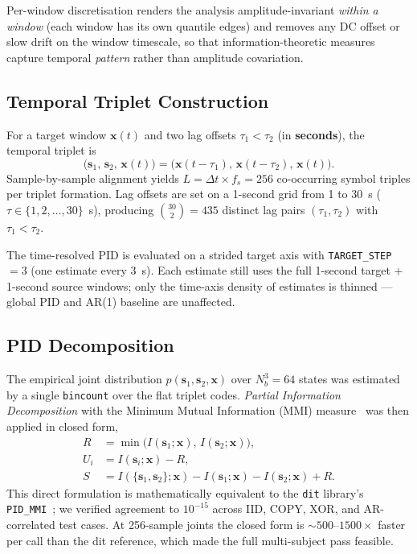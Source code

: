 \documentclass[11pt,a4paper]{article}
\begin{document}
Per-window discretisation renders the analysis amplitude-invariant
\emph{within a window} (each window has its own quantile edges) and removes
any DC offset or slow drift on the window timescale, so that
information-theoretic measures capture temporal \emph{pattern} rather than
amplitude covariation.

\subsection{Temporal Triplet Construction}

For a target window $\mathbf{x}(t)$ and two lag offsets $\tau_1 < \tau_2$
(in \textbf{seconds}), the temporal triplet is
\begin{equation}
  \bigl(\mathbf{s}_1,\, \mathbf{s}_2,\, \mathbf{x}(t)\bigr)
  = \bigl(\mathbf{x}(t - \tau_1),\, \mathbf{x}(t - \tau_2),\, \mathbf{x}(t)\bigr).
\end{equation}
Sample-by-sample alignment yields $L = \Delta t \times f_s = 256$
co-occurring symbol triples per triplet formation.
Lag offsets are set on a 1-second grid from 1 to 30~s
($\tau \in \{1, 2, \ldots, 30\}$~s), producing
$\binom{30}{2} = 435$ distinct lag pairs $(\tau_1, \tau_2)$ with
$\tau_1 < \tau_2$.

The time-resolved PID is evaluated on a strided target axis with
\texttt{TARGET\_STEP} $= 3$ (one estimate every 3~s).  Each estimate still
uses the full 1-second target + 1-second source windows; only the time-axis
density of estimates is thinned --- global PID and AR(1) baseline are
unaffected.

\subsection{PID Decomposition}

The empirical joint distribution $p(\mathbf{s}_1, \mathbf{s}_2, \mathbf{x})$
over $N_b^3 = 64$ states was estimated by a single \texttt{bincount} over the
flat triplet codes.  \emph{Partial Information Decomposition} with the
Minimum Mutual Information (MMI) measure~\citep{barrett2015exploration} was
then applied in closed form,
\begin{align}
  R &= \min\!\bigl(I(\mathbf{s}_1;\mathbf{x}),\, I(\mathbf{s}_2;\mathbf{x})\bigr), \\
  U_i &= I(\mathbf{s}_i;\mathbf{x}) - R, \\
  S &= I(\{\mathbf{s}_1,\mathbf{s}_2\};\mathbf{x})
      - I(\mathbf{s}_1;\mathbf{x}) - I(\mathbf{s}_2;\mathbf{x}) + R.
\end{align}
This direct formulation is mathematically equivalent to the \texttt{dit}
library's \texttt{PID\_MMI}~\citep{james2018dit}; we verified agreement to
$10^{-15}$ across IID, COPY, XOR, and AR-correlated test cases.  At
256-sample joints the closed form is $\sim 500$--$1500\times$ faster per call
than the dit reference, which made the full multi-subject pass feasible.
\end{document}
